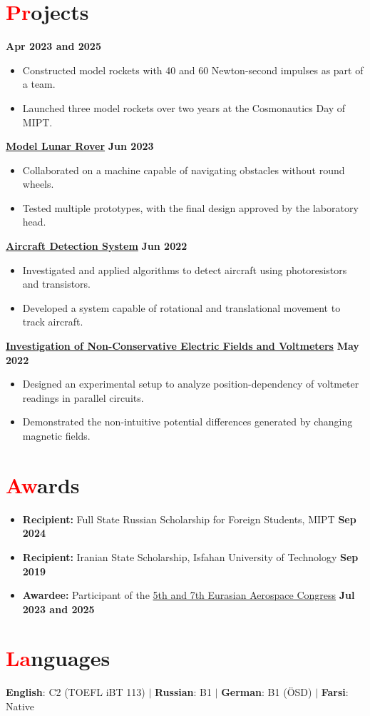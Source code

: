 \documentclass[a4paper,11pt]{article}
\newcommand{\resumesection}[2]{\section{\textcolor{red}{#1}#2}}
\begin{document}
\resumesection{Pr}{ojects}
     \hfill \textbf{Apr 2023 and 2025}
    \begin{itemize}
    \item Constructed model rockets with 40 and 60 Newton-second impulses as part of a team.
    \item Launched three model rockets over two years at the Cosmonautics Day of MIPT.
    \end{itemize}
    {\href{https://github.com/rezaaliasgarirenani/Rover}{\textbf{Model Lunar Rover}}} \hfill \textbf{Jun 2023}
    \begin{itemize}
    \item Collaborated on a machine capable of navigating obstacles without round wheels.
    \item Tested multiple prototypes, with the final design approved by the laboratory head.
    \end{itemize}
    {\href{https://github.com/rezaaliasgarirenani/Aircraft-Detection-System}{\textbf{Aircraft Detection System}}} \hfill \textbf{Jun 2022}
    \begin{itemize}
    \item Investigated and applied algorithms to detect aircraft using photoresistors and transistors.
    \item Developed a system capable of rotational and translational movement to track aircraft.
    \end{itemize}
    {\href{https://github.com/rezaaliasgarirenani/Non-Conservative-Electric-Fields-and-Voltmeters}{\textbf{Investigation of Non-Conservative Electric Fields and Voltmeters}}} \hfill \textbf{May 2022}
    \begin{itemize}
    \item Designed an experimental setup to analyze position-dependency of voltmeter readings in parallel circuits.
    \item Demonstrated the non-intuitive potential differences generated by changing magnetic fields.
    \end{itemize}

\resumesection{Aw}{ards}
\begin{itemize}
    \item{\textbf{Recipient:} Full State Russian Scholarship for Foreign Students, MIPT} \hfill \textbf{Sep 2024}
    \item{\textbf{Recipient:} Iranian State Scholarship, Isfahan University of Technology} \hfill \textbf{Sep 2019}
    \item{\textbf{Awardee:} Participant of the \href{https://congress.aero/en/}{5th and 7th Eurasian Aerospace Congress}} \hfill \textbf{Jul 2023 and 2025}
\end{itemize}

\resumesection{La}{nguages}
{\centering
    \textbf{English}: C2 (TOEFL iBT 113) \quad $|$ \quad 
    \textbf{Russian}: B1 \quad $|$ \quad 
    \textbf{German}: B1 (ÖSD) \quad $|$ \quad 
    \textbf{Farsi}: Native
\par}
\end{document}
